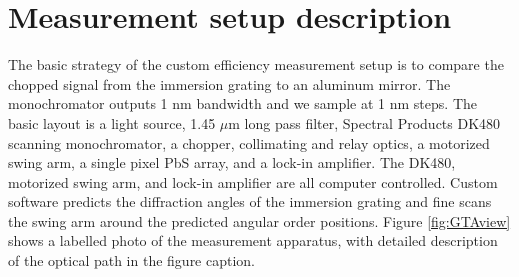 \documentclass[]{spie}
\begin{document}
\appendix    %
\section{Measurement setup description} \label{sec:GTA}
The basic strategy of the custom efficiency measurement setup is to compare the chopped signal from the immersion grating to an aluminum mirror.  The monochromator outputs 1 nm bandwidth and we sample at 1 nm steps.  The basic layout is a light source, 1.45 $\mu$m long pass filter, Spectral Products DK480 scanning monochromator, a chopper, collimating and relay optics, a motorized swing arm, a single pixel PbS array, and a lock-in amplifier.  The DK480, motorized swing arm, and lock-in amplifier are all computer controlled.  Custom software predicts the diffraction angles of the immersion grating and fine scans the swing arm around the predicted angular order positions.  Figure \ref{fig:GTAview} shows a labelled photo of the measurement apparatus, with detailed description of the optical path in the figure caption.  
\end{document}
